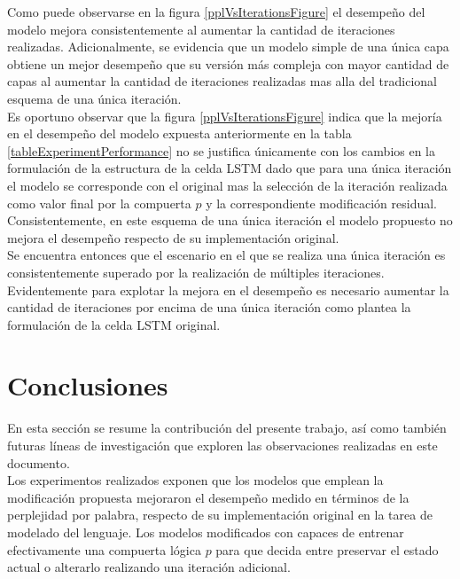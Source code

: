 \documentclass{article}
\begin{document}
	Como puede observarse en la figura \ref{pplVsIterationsFigure} el desempeño del modelo mejora consistentemente al aumentar la cantidad de iteraciones realizadas. Adicionalmente, se evidencia que un modelo simple de una única capa obtiene un mejor desempeño que su versión más compleja con mayor cantidad de capas al aumentar la cantidad de iteraciones realizadas mas alla del tradicional esquema de una única iteración.\\
	
	Es oportuno observar que la figura \ref{pplVsIterationsFigure} indica que la mejoría en el desempeño del modelo expuesta anteriormente en la tabla \ref{tableExperimentPerformance} no se justifica únicamente con los cambios en la formulación de la estructura de la celda LSTM dado que para una única iteración el modelo se corresponde con el original mas la selección de la iteración realizada como valor final por la compuerta $p$ y la correspondiente modificación residual. \\
	Consistentemente, en este esquema de una única iteración el modelo propuesto no mejora el desempeño respecto de su implementación original.\\
	Se encuentra entonces que el escenario en el que se realiza una única iteración es consistentemente superado por la realización de múltiples iteraciones.\\
	Evidentemente para explotar la mejora en el desempeño es necesario aumentar la cantidad de iteraciones por encima de una única iteración como plantea la formulación de la celda LSTM original.\\
	
	\pagebreak
	
	\section{Conclusiones}\label{sectionConclusions}
	En esta sección se resume la contribución del presente trabajo, así como también futuras líneas de investigación que exploren las observaciones realizadas en este documento.\\
	
	Los experimentos realizados exponen que los modelos que emplean la modificación propuesta mejoraron el desempeño medido en términos de la perplejidad por palabra, respecto de su implementación original en la tarea de modelado del lenguaje. Los modelos modificados con capaces de entrenar efectivamente una compuerta lógica $p$ para que decida entre preservar el estado actual o alterarlo realizando una iteración adicional.\\
	
\end{document}
